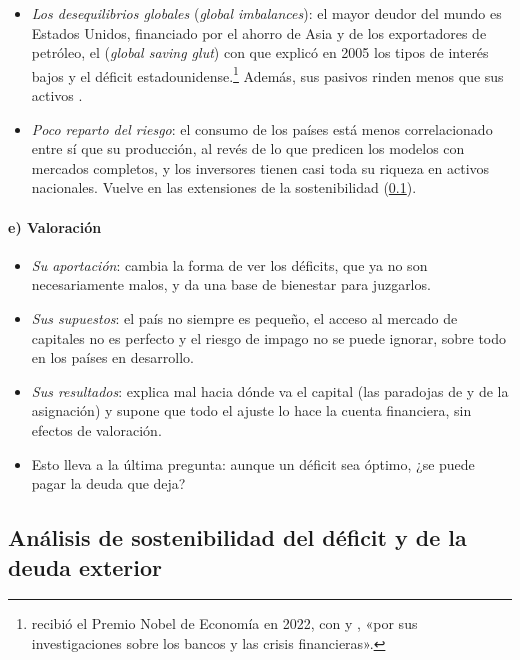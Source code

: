 \documentclass[11pt]{article}
\begin{document}
\begin{itemize}
\item \emph{Los desequilibrios globales} (\emph{global imbalances}): el mayor deudor del mundo es Estados Unidos, financiado por el ahorro de Asia y de los exportadores de petróleo, el  (\emph{global saving glut}) con que  explicó en 2005 los tipos de interés bajos y el déficit estadounidense\nocite{Bernanke2005Saving}.\footnote{ recibió el Premio Nobel de Economía en 2022, con  y , «por sus investigaciones sobre los bancos y las crisis financieras»\nocite{Nobel2022Bancos}.} Además, sus pasivos rinden menos que sus activos\nocite{GourinchasRey2014} .
\item \emph{Poco reparto del riesgo}: el consumo de los países está menos correlacionado entre sí que su producción, al revés de lo que predicen los modelos con mercados completos, y los inversores tienen casi toda su riqueza en activos nacionales\nocite{BackusKehoeKydland1992International,Lewis1999,ObstfeldRogoff2000Six}. Vuelve en las extensiones de la sostenibilidad (\ref{sec:sostenibilidad}).
\end{itemize}

\paragraph{e) Valoración}

\begin{itemize}
\item \emph{Su aportación}: cambia la forma de ver los déficits, que ya no son necesariamente malos, y da una base de bienestar para juzgarlos.
\item \emph{Sus supuestos}: el país no siempre es pequeño, el acceso al mercado de capitales no es perfecto y el riesgo de impago no se puede ignorar, sobre todo en los países en desarrollo.
\item \emph{Sus resultados}: explica mal hacia dónde va el capital (las paradojas de  y de la asignación) y supone que todo el ajuste lo hace la cuenta financiera, sin efectos de valoración.
\item Esto lleva a la última pregunta: aunque un déficit sea óptimo, ¿se puede pagar la deuda que deja?
\end{itemize}

\subsection{Análisis de sostenibilidad del déficit y de la deuda exterior}\label{sec:sostenibilidad}
\end{document}
